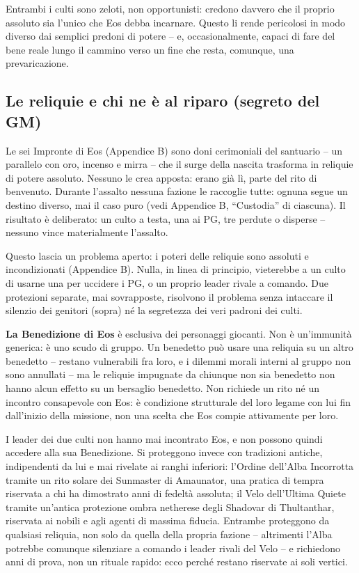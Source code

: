Entrambi i culti sono zeloti, non opportunisti: credono davvero che il proprio assoluto sia l'unico che Eos debba incarnare. Questo li rende pericolosi in modo diverso dai semplici predoni di potere -- e, occasionalmente, capaci di fare del bene reale lungo il cammino verso un fine che resta, comunque, una prevaricazione.

\subsection{Le reliquie e chi ne è al riparo (segreto del GM)}

Le sei Impronte di Eos (Appendice B) sono doni cerimoniali del santuario -- un parallelo con oro, incenso e mirra -- che il surge della nascita trasforma in reliquie di potere assoluto. Nessuno le crea apposta: erano già lì, parte del rito di benvenuto. Durante l'assalto nessuna fazione le raccoglie tutte: ognuna segue un destino diverso, mai il caso puro (vedi Appendice B, ``Custodia'' di ciascuna). Il risultato è deliberato: un culto a testa, una ai PG, tre perdute o disperse -- nessuno vince materialmente l'assalto.

Questo lascia un problema aperto: i poteri delle reliquie sono assoluti e incondizionati (Appendice B). Nulla, in linea di principio, vieterebbe a un culto di usarne una per uccidere i PG, o un proprio leader rivale a comando. Due protezioni separate, mai sovrapposte, risolvono il problema senza intaccare il silenzio dei genitori (sopra) né la segretezza dei veri padroni dei culti.

\textbf{La Benedizione di Eos} è esclusiva dei personaggi giocanti. Non è un'immunità generica: è uno scudo di gruppo. Un benedetto può usare una reliquia su un altro benedetto -- restano vulnerabili fra loro, e i dilemmi morali interni al gruppo non sono annullati -- ma le reliquie impugnate da chiunque non sia benedetto non hanno alcun effetto su un bersaglio benedetto. Non richiede un rito né un incontro consapevole con Eos: è condizione strutturale del loro legame con lui fin dall'inizio della missione, non una scelta che Eos compie attivamente per loro.

I leader dei due culti non hanno mai incontrato Eos, e non possono quindi accedere alla sua Benedizione. Si proteggono invece con tradizioni antiche, indipendenti da lui e mai rivelate ai ranghi inferiori: l'Ordine dell'Alba Incorrotta tramite un rito solare dei Sunmaster di Amaunator, una pratica di tempra riservata a chi ha dimostrato anni di fedeltà assoluta; il Velo dell'Ultima Quiete tramite un'antica protezione ombra netherese degli Shadovar di Thultanthar, riservata ai nobili e agli agenti di massima fiducia. Entrambe proteggono da qualsiasi reliquia, non solo da quella della propria fazione -- altrimenti l'Alba potrebbe comunque silenziare a comando i leader rivali del Velo -- e richiedono anni di prova, non un rituale rapido: ecco perché restano riservate ai soli vertici.

